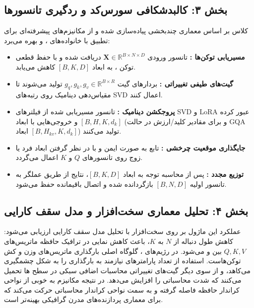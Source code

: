 \subsection*{بخش ۳: کالبدشکافی سورس‌کد و ردگیری تانسورها }
کلاس  بر اساس معماری چندبخشی پیاده‌سازی شده و از مکانیزم‌های پیشرفته‌ای برای تطبیق با خانواده‌های ،  و  بهره می‌برد:
\begin{itemize}
    \item \textbf{مسیریابی توکن‌ها :} تانسور ورودی $\mathbf{X} \in \mathbb{R}^{B \times N \times D}$ دریافت شده و با حفظ قطعی توکن \lr{[CLS]}، به ابعاد $[B, K, D]$ کاهش می‌یابد. 
    \item \textbf{گیت‌های طیفی تغییراتی :} بردارهای گیت $g_q, g_k, g_v \in \mathbb{R}^{B \times R}$ تولید می‌شوند تا مقیاس‌دهی دینامیک روی رتبه‌های SVD اعمال کنند.
    \item \textbf{پروجکشن دینامیک :} تانسور مسیریابی شده از فیلترهای SVD و LoRA عبور کرده و خروجی‌هایی با ابعاد $[B, H, K, d_k]$ (و برای مقادیر کلید/ارزش در حالت GQA ابعاد $[B, H_{kv}, K, d_k]$) تولید می‌کنند.
    \item \textbf{جایگذاری موقعیت چرخشی :} تابع  به صورت ایمن و با در نظر گرفتن ابعاد فرد یا زوج روی تانسورهای $Q$ و $K$ اعمال می‌گردد.
    \item \textbf{توزیع مجدد :} پس از محاسبه توجه به ابعاد $[B, K, D]$، نتایج از طریق عملگر  به تانسور اولیه $[B, N, D]$ بازگردانده شده و اتصال باقیمانده  حفظ می‌شود.
\end{itemize}

\subsection*{بخش ۴: تحلیل معماری سخت‌افزار و مدل سقف کارایی }
عملکرد این ماژول بر روی سخت‌افزار  با تحلیل مدل سقف کارایی  ارزیابی می‌شود:
کاهش طول دنباله از $N$ به $K$، باعث کاهش نمایی در ترافیک حافظه  ماتریس‌های $Q, K, V$ بین  و  می‌شود. 
در رژیم‌های ، گلوگاه اصلی بارگذاری ماتریس‌های وزن و کش توکن‌هاست. 
استفاده از  تعداد پارامترهای نیازمند به بارگذاری را به شکل چشمگیری می‌کاهد، و از سوی دیگر گیت‌های تغییراتی محاسبات اضافی سبکی در سطح ها تحمیل می‌کنند که شدت محاسباتی  را افزایش می‌دهد. 
در نتیجه مکانیزم  به خوبی از نواحی کراندار حافظه فاصله گرفته و به سمت نواحی کراندار محاسباتی  حرکت می‌کند که برای معماری پردازنده‌های مدرن گرافیکی بهینه‌تر است.

